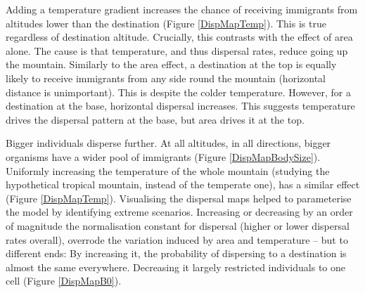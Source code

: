 \documentclass[11pt]{article}
\begin{document}
Adding a temperature gradient increases the chance of receiving immigrants from altitudes lower than the destination (Figure \ref{DispMapTemp}). This is true regardless of destination altitude. Crucially, this contrasts with the effect of area alone. The cause is that temperature, and thus dispersal rates, reduce going up the mountain. Similarly to the area effect, a destination at the top is equally likely to receive immigrants from any side round the mountain (horizontal distance is unimportant). This is despite the colder temperature. However, for a destination at the base, horizontal dispersal increases. This suggests temperature drives the dispersal  pattern at the base, but area drives it at the top.

Bigger individuals disperse further. At all altitudes, in all directions, bigger organisms have a wider pool of immigrants (Figure \ref{DispMapBodySize}). Uniformly increasing the temperature of the whole mountain (studying the hypothetical tropical mountain, instead of the temperate one), has a similar effect (Figure \ref{DispMapTemp}). Visualising the dispersal maps helped to parameterise the model by identifying extreme scenarios. Increasing or decreasing by an order of magnitude the normalisation constant for dispersal (higher or lower dispersal rates overall), overrode the variation induced by area and temperature – but to different ends: By increasing it, the probability of dispersing to a destination is almost the same everywhere. Decreasing it largely restricted individuals to one cell (Figure \ref{DispMapB0}). %
\end{document}
